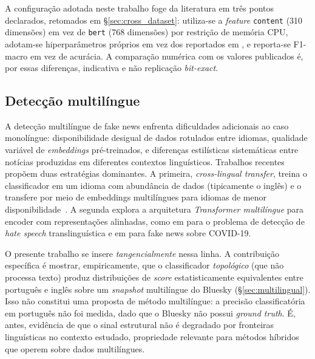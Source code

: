 A configura\c{c}\~ao adotada neste trabalho foge da literatura em tr\^es pontos
declarados, retomados em \S\ref{sec:cross_dataset}: utiliza-se a
\emph{feature} \texttt{content} (310 dimens\~oes) em vez de
\texttt{bert} (768 dimens\~oes) por restri\c{c}\~ao de mem\'oria CPU,
adotam-se hiperpar\^ametros pr\'oprios em vez dos reportados em
\cite{dou2021upfd}, e reporta-se F1-macro em vez de acur\'acia. A
compara\c{c}\~ao num\'erica com os valores publicados \'e, por essas
diferen\c{c}as, indicativa e n\~ao replica\c{c}\~ao \emph{bit-exact}.

\subsection{Detec\c{c}\~ao multil\'ingue}
\label{sec:multilingue}

A detec\c{c}\~ao multil\'ingue de fake news enfrenta dificuldades
adicionais ao caso monol\'ingue: disponibilidade desigual de dados
rotulados entre idiomas, qualidade vari\'avel de \emph{embeddings}
pr\'e-treinados, e diferen\c{c}as estil\'isticas sistem\'aticas entre
not\'icias produzidas em diferentes contextos lingu\'isticos.
Trabalhos recentes prop\~oem duas estrat\'egias dominantes. A
primeira, \emph{cross-lingual transfer}, treina o classificador em um
idioma com abund\^ancia de dados (tipicamente o ingl\^es) e o
transfere por meio de embeddings multil\'ingues para idiomas de menor
disponibilidade~\cite{crosslanguagefakenews}. A segunda explora a
arquitetura \emph{Transformer multil\'ingue} para encoder com
representa\c{c}\~oes alinhadas, como em \cite{acl_hemt} para o
problema de detec\c{c}\~ao de \emph{hate speech} translingu\'istica e
em \cite{pmc_multilangs_covid} para fake news sobre COVID-19.

O presente trabalho se insere \emph{tangencialmente} nessa linha. A
contribui\c{c}\~ao espec\'ifica \'e mostrar, empiricamente, que o
classificador \emph{topol\'ogico} (que n\~ao processa texto) produz
distribui\c{c}\~oes de \emph{score} estatisticamente equivalentes entre
portugu\^es e ingl\^es sobre um \emph{snapshot} multil\'ingue do
Bluesky (\S\ref{sec:multilingual}). Isso n\~ao constitui uma proposta
de m\'etodo multil\'ingue: a precis\~ao classificat\'oria em
portugu\^es n\~ao foi medida, dado que o Bluesky n\~ao possui
\emph{ground truth}. \'E, antes, evid\^encia de que o sinal estrutural n\~ao \'e degradado por
fronteiras lingu\'isticas no contexto estudado, propriedade relevante
para m\'etodos h\'ibridos que operem sobre dados multil\'ingues.

